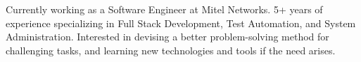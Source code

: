 

\begin{cvparagraph}

Currently working as a Software Engineer at Mitel Networks. 5+ years of experience specializing in Full Stack Development, Test Automation, and System Administration. Interested in devising a better problem-solving method for challenging tasks, and learning new technologies and tools if the need arises.
\end{cvparagraph}
